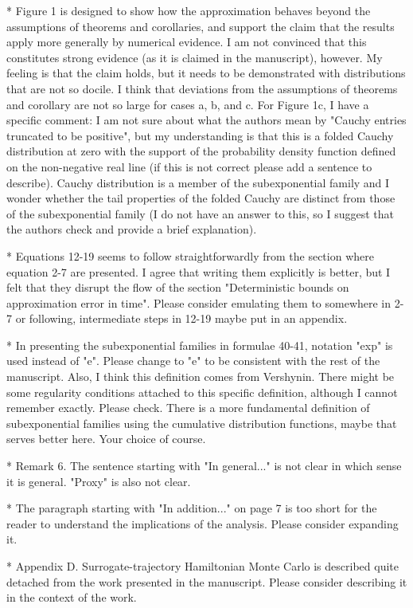 \documentclass[12pt]{article}
\begin{document}
* Figure 1 is designed to show how the approximation behaves beyond the assumptions of theorems and corollaries, and support the claim that the results apply more generally by numerical evidence. I am not convinced that this constitutes strong evidence (as it is claimed in the manuscript), however. My feeling is that the claim holds, but it needs to be demonstrated with distributions that are not so docile. I think that deviations from the assumptions of theorems and corollary are not so large for cases a, b, and c. For Figure 1c, I have a specific comment: I am not sure about what the authors mean by "Cauchy entries truncated to be positive", but my understanding is that this is a folded Cauchy distribution at zero with the support of the probability density function defined on the non-negative real line (if this is not correct please add a sentence to describe). Cauchy distribution is a member of the subexponential family and I wonder whether the tail properties of the folded Cauchy are distinct from those of the subexponential family (I do not have an answer to this, so I suggest that the authors check and provide a brief explanation). 

* Equations 12-19 seems to follow straightforwardly from the section where equation 2-7 are presented. I agree that writing them explicitly is better, but I felt that they disrupt the flow of the section "Deterministic bounds on approximation error in time". Please consider emulating them to somewhere in 2-7 or following, intermediate steps in 12-19 maybe put in an appendix. 

* In presenting the subexponential families in formulae 40-41, notation "exp" is used instead of "e". Please change to "e" to be consistent with the rest of the manuscript. Also, I think this definition comes from Vershynin. There might be some regularity conditions attached to this specific definition, although I cannot remember exactly. Please check. There is a more fundamental definition of subexponential families using the cumulative distribution functions, maybe that serves better here. Your choice of course. 

* Remark 6. The sentence starting with "In general..." is not clear in which sense it is general. "Proxy" is also not clear. 

* The paragraph starting with "In addition..." on page 7 is too short for the reader to understand the implications of the analysis. Please consider expanding it. 

* Appendix D. Surrogate-trajectory Hamiltonian Monte Carlo is described quite detached from the work presented in the manuscript. Please consider describing it in the context of the work. 
\end{document}
